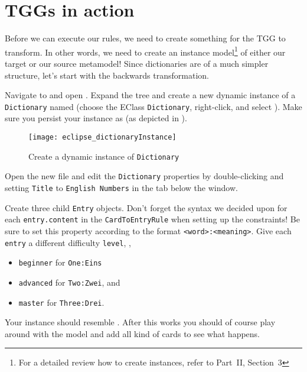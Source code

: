 \newpage
\section{TGGs in action}
\genHeader
\label{sect:TGGs_in_Action}

Before we can execute our rules, we need to create something for the TGG to transform. In other words, we need to create an instance model\footnote{For a
detailed review how to create instances, refer to Part~II, Section~3} of either our target or our source metamodel! Since dictionaries are of a much simpler structure, let's start with the backwards transformation.

\begin{stepbystep}

\item Navigate to  and open .
Expand the tree and create a new dynamic instance of a \texttt{Dictionary} named  (choose the EClass \texttt{Dictionary}, right-click, and select ). 
Make sure you persist your instance as  (as depicted in ).

\begin{figure}[htbp]
\begin{center}
  \texttt{[image: eclipse\_dictionaryInstance]}
  \caption{Create a dynamic instance of \texttt{Dictionary}}
  \label{eclipse:create_instance_dict}
\end{center}
\end{figure}

\newpage

\item Open the new file and edit the \texttt{Dictionary} properties by double-clicking and setting \texttt{Title} to \texttt{English Numbers} in the  tab below the window.

\vspace{0.5cm}

\item Create three child \texttt{Entry} objects.
Don't forget the syntax we decided upon for each \texttt{entry.content} in the \texttt{CardToEntryRule} when setting up the constraints! 
Be sure to set this property according to the format \texttt{<word>:<meaning>}. 
Give each \texttt{entry} a different difficulty \texttt{level}, \eg, 
\begin{itemize}
\item \texttt{beginner} for \texttt{One:Eins}
\item \texttt{advanced} for \texttt{Two:Zwei}, and 
\item \texttt{master} for \texttt{Three:Drei}.
\end{itemize}
Your instance should resemble .
After this works you should of course play around with the model and add all kind of cards to see what happens.


\end{stepbystep}
